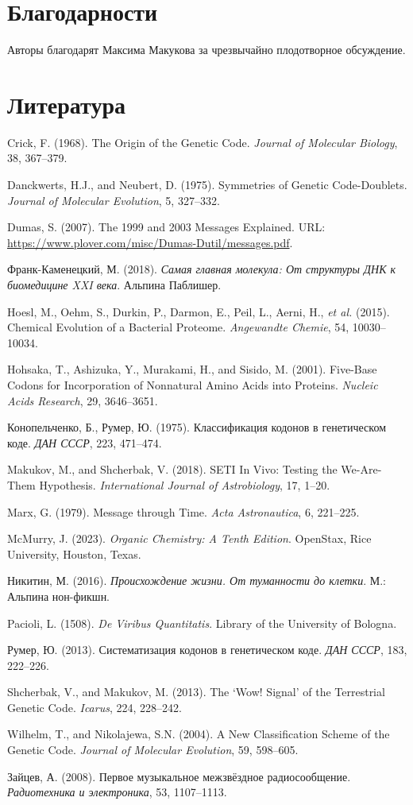 \documentclass[12pt]{article}
\begin{document}
\section*{Благодарности}

Авторы благодарят Максима Макукова за чрезвычайно плодотворное обсуждение.


\section*{Литература}

\begin{description}
\item Crick, F. (1968). The Origin of the Genetic Code. \textit{Journal of Molecular Biology}, 38, 367--379.
\item Danckwerts, H.J., and Neubert, D. (1975). Symmetries of Genetic Code-Doublets. \textit{Journal of Molecular Evolution}, 5, 327--332.
\item Dumas, S. (2007). The 1999 and 2003 Messages Explained. URL: \url{https://www.plover.com/misc/Dumas-Dutil/messages.pdf}.
\item Франк-Каменецкий, М. (2018). \textit{Самая главная молекула: От структуры ДНК к биомедицине XXI века}. Альпина Паблишер.
\item Hoesl, M., Oehm, S., Durkin, P., Darmon, E., Peil, L., Aerni, H., \textit{et al.} (2015). Chemical Evolution of a Bacterial Proteome. \textit{Angewandte Chemie}, 54, 10030--10034.
\item Hohsaka, T., Ashizuka, Y., Murakami, H., and Sisido, M. (2001). Five-Base Codons for Incorporation of Nonnatural Amino Acids into Proteins. \textit{Nucleic Acids Research}, 29, 3646--3651.
\item Конопельченко, Б., Румер, Ю. (1975). Классификация кодонов в генетическом коде. \textit{ДАН СССР}, 223, 471--474.
\item Makukov, M., and Shcherbak, V. (2018). SETI In Vivo: Testing the We-Are-Them Hypothesis. \textit{International Journal of Astrobiology}, 17, 1--20.
\item Marx, G. (1979). Message through Time. \textit{Acta Astronautica}, 6, 221--225.
\item McMurry, J. (2023). \textit{Organic Chemistry: A Tenth Edition}. OpenStax, Rice University, Houston, Texas.
\item Никитин, М. (2016). \textit{Происхождение жизни. От туманности до клетки}. М.: Альпина нон-фикшн.
\item Pacioli, L. (1508). \textit{De Viribus Quantitatis}. Library of the University of Bologna.
\item Румер, Ю. (2013). Систематизация кодонов в генетическом коде. \textit{ДАН СССР}, 183, 222--226.
\item Shcherbak, V., and Makukov, M. (2013). The `Wow! Signal' of the Terrestrial Genetic Code. \textit{Icarus}, 224, 228--242.
\item Wilhelm, T., and Nikolajewa, S.N. (2004). A New Classification Scheme of the Genetic Code. \textit{Journal of Molecular Evolution}, 59, 598--605.
\item Зайцев, А. (2008). Первое музыкальное межзвёздное радиосообщение. \textit{Радиотехника и электроника}, 53, 1107--1113.
\end{description}
\end{document}
